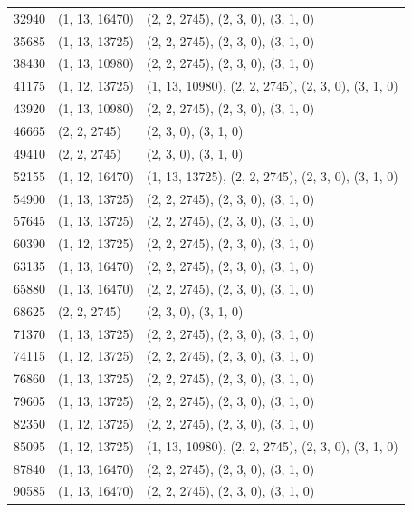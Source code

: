 \begin{longtable}{@{\extracolsep{\fill}}lll}
32940  & (1, 13, 16470) & (2, 2, 2745), (2, 3, 0), (3, 1, 0)                  \\
35685  & (1, 13, 13725) & (2, 2, 2745), (2, 3, 0), (3, 1, 0)                  \\
38430  & (1, 13, 10980) & (2, 2, 2745), (2, 3, 0), (3, 1, 0)                  \\
41175  & (1, 12, 13725) & (1, 13, 10980), (2, 2, 2745), (2, 3, 0), (3, 1, 0)  \\
43920  & (1, 13, 10980) & (2, 2, 2745), (2, 3, 0), (3, 1, 0)                  \\
46665  & (2, 2, 2745)   & (2, 3, 0), (3, 1, 0)                                \\
49410  & (2, 2, 2745)   & (2, 3, 0), (3, 1, 0)                                \\
52155  & (1, 12, 16470) & (1, 13, 13725), (2, 2, 2745), (2, 3, 0), (3, 1, 0)  \\
54900  & (1, 13, 13725) & (2, 2, 2745), (2, 3, 0), (3, 1, 0)                  \\
57645  & (1, 13, 13725) & (2, 2, 2745), (2, 3, 0), (3, 1, 0)                  \\
60390  & (1, 12, 13725) & (2, 2, 2745), (2, 3, 0), (3, 1, 0)                  \\
63135  & (1, 13, 16470) & (2, 2, 2745), (2, 3, 0), (3, 1, 0)                  \\
65880  & (1, 13, 16470) & (2, 2, 2745), (2, 3, 0), (3, 1, 0)                  \\
68625  & (2, 2, 2745)   & (2, 3, 0), (3, 1, 0)                                \\
71370  & (1, 13, 13725) & (2, 2, 2745), (2, 3, 0), (3, 1, 0)                  \\
74115  & (1, 12, 13725) & (2, 2, 2745), (2, 3, 0), (3, 1, 0)                  \\
76860  & (1, 13, 13725) & (2, 2, 2745), (2, 3, 0), (3, 1, 0)                  \\
79605  & (1, 13, 13725) & (2, 2, 2745), (2, 3, 0), (3, 1, 0)                  \\
82350  & (1, 12, 13725) & (2, 2, 2745), (2, 3, 0), (3, 1, 0)                  \\
85095  & (1, 12, 13725) & (1, 13, 10980), (2, 2, 2745), (2, 3, 0), (3, 1, 0)  \\
87840  & (1, 13, 16470) & (2, 2, 2745), (2, 3, 0), (3, 1, 0)                  \\
90585  & (1, 13, 16470) & (2, 2, 2745), (2, 3, 0), (3, 1, 0)                  \\

\end{longtable}
